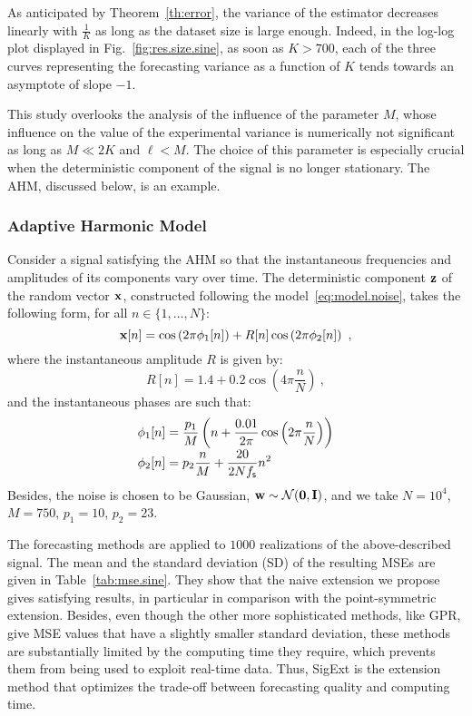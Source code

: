 As anticipated by Theorem~\ref{th:error}, the variance of the estimator decreases linearly with $\frac1K$ as long as the dataset size is large enough. Indeed, in the log-log plot displayed in Fig.~\ref{fig:res.size.sine}, as soon as $K>700$, each of the three curves representing the forecasting variance as a function of $K$ tends towards an asymptote of slope $-1$.


This study overlooks the analysis of the influence of the parameter $M$, whose influence on the value of the experimental variance is numerically not significant as long as $M\ll 2K$ and $\ell<M$. The choice of this parameter is especially crucial when the deterministic component of the signal is no longer stationary. The AHM, discussed below, is an example.

\subsubsection{Adaptive Harmonic Model}
\label{ssse:res.ahm}
Consider a signal satisfying the AHM so that the instantaneous frequencies and amplitudes of its components vary over time. The deterministic component ${\mathbf z}$ of the random vector ${\mathbf x}$, constructed following the model~\eqref{eq:model.noise}, takes the following form, for all $n\in\{1,\ldots,N\}$:
\[
{\mathbf x}[n] = \cos\left(2\pi \phi_1[n] \right) + R[n]\cos\left(2\pi \phi_2[n] \right) \ ,
\] 
where the instantaneous amplitude $R$ is given by:
\[
R[n] = 1.4 + 0.2\cos\left(4\pi\frac{n}{N}\right)\ ,
\]
and the instantaneous phases are such that:
\begin{align*}
\phi_1[n] &= \frac{p_1}{M}\left( n + \frac{0.01}{2\pi}\cos\left(2\pi\frac{n}{N}\right) \right) \\[-1mm]
\phi_2[n] & = p_2\frac{n}{M} + \frac{20}{2Nf_{\mathsf s}}n^2
\end{align*}
Besides, the noise is chosen to be Gaussian, ${\mathbf w}\sim{\mathcal N}(\boldsymbol{0},{\mathbf I})$, and we take $N=10^4$, $M=750$, $p_1=10$, $p_2=23$.

The forecasting methods are applied to $1000$ realizations of the above-described signal. The mean and the standard deviation (SD) of the resulting MSEs are given in Table~\ref{tab:mse.sine}. They show that the naive extension we propose gives satisfying results, in particular in comparison with the point-symmetric extension. Besides, even though the other more sophisticated methods, like GPR, give MSE values that have a slightly smaller standard deviation, these methods are substantially limited by the computing time they require, which prevents them from being used to exploit real-time data. Thus, {\sf SigExt} is the extension method that optimizes the trade-off between forecasting quality and computing time.

